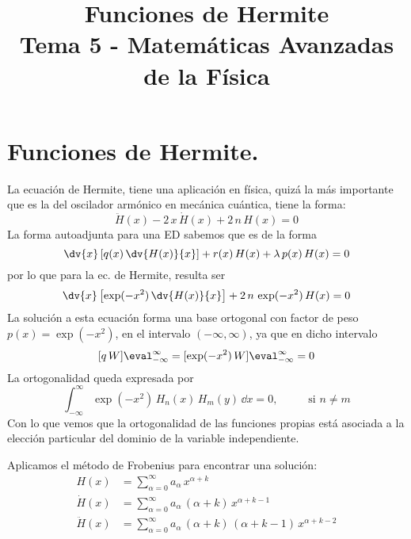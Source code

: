 
\title{Funciones de Hermite \\ {\large Tema 5 - Matemáticas Avanzadas de la Física}\vspace{-1.5\baselineskip}}
\date{ }

\maketitle
\fontsize{14}{14}\selectfont
\section{Funciones de Hermite.}
La ecuación de Hermite, tiene una aplicación en física, quizá la más importante que es la del oscilador armónico en mecánica cuántica, tiene la forma:
\begin{equation}
\ddot{H}(x) - 2 \, x \,  \dot{H}(x) + 2\, n \, H(x) = 0
\label{eq:ecuacion_08_58}
\end{equation}
La forma autoadjunta para una ED sabemos que es de la forma
\[ \dv{x} \left[ q(x) \, \dv{H(x)}{x} \right] + r(x) \, H(x) + \lambda \, p(x) \, H(x) = 0 \]
por lo que para la ec. de Hermite, resulta ser
\begin{equation}
\dv{x} \left[ \exp(-x^{2}) \, \dv{H(x)}{x} \right] + 2 \, n \, \exp(-x^{2}) \, H(x) = 0
\label{eq:ecuacion_08_59}
\end{equation}
La solución a esta ecuación forma una base ortogonal con factor de peso $p(x) = \exp(-x^{2})$, en el intervalo $(-\infty, \infty)$, ya que en dicho intervalo
\[ [q \, W]\eval_{-\infty}^{\infty} = [ \exp(-x^{2}) \, W ]\eval_{-\infty}^{\infty} = 0 \]
La ortogonalidad queda expresada por
\[ \int_{-\infty}^{\infty} \exp(-x^{2}) \, H_{n}(x) \, H_{m}(y) \, \dd{x} = 0, \hspace{1cm} \mbox{ si } n \neq m \]
Con lo que vemos que la ortogonalidad de las funciones propias está asociada a la elección particular del dominio de la variable independiente.
\par
Aplicamos el método de Frobenius para encontrar una solución:
\begin{align*}
H(x) &= \sum_{\alpha = 0}^{\infty} a_{\alpha} \, x^{\alpha+k} \\[1em]
\dot{H}(x) &= \sum_{\alpha = 0}^{\infty} a_{\alpha} \, (\alpha + k) \, x^{\alpha+k-1} \\[1em]
\ddot{H}(x) &= \sum_{\alpha = 0}^{\infty} a_{\alpha} \, (\alpha + k) \, (\alpha + k - 1) \, x^{\alpha+k-2}
\end{align*}
